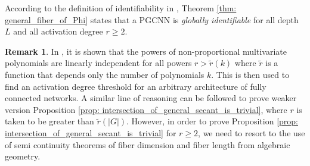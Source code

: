 \documentclass[final]{article}
\theoremstyle{definition}
\newtheorem{remark}[definition]{Remark}
\theoremstyle{plain}
\begin{document}
According to the definition of identifiability in \cite{usevich2025identifiabilitydeeppolynomialneural}, Theorem \ref{thm: general_fiber_of_Phi} states that a PGCNN is \emph{globally identifiable} for all depth $L$ and all activation degree $r\geq 2$.

\begin{remark}
    In \cite{finkel2025activationdegreethresholdsexpressiveness}, it is shown that
    the powers of non-proportional multivariate polynomials are linearly independent for all powers $r>\tilde{r}(k)$ where $\tilde{r}$ is a function that depends only the number of polynomials $k$. This is then used to find an activation degree threshold for an arbitrary architecture of fully connected networks. A similar line of reasoning can be followed to prove weaker version Proposition \ref{prop: intersection_of_general_secant_is_trivial}, where $r$ is taken to be greater than $\tilde{r}(|G|)$. 
    However, in order to prove Proposition \ref{prop: intersection_of_general_secant_is_trivial} for $r\geq 2$, we need to resort to the use of semi continuity theorems of fiber dimension and fiber length from algebraic geometry.
\end{remark}
\end{document}
